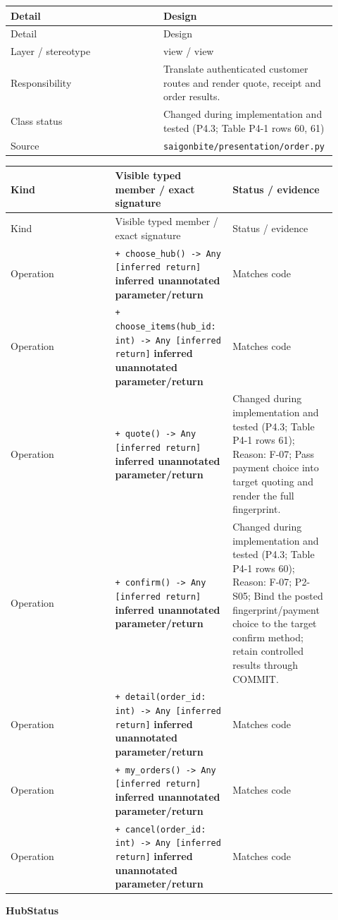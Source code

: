 \begin{longtable}{>{\raggedright\arraybackslash}p{0.4600\linewidth}>{\raggedright\arraybackslash}p{0.4600\linewidth}}
Detail & Design \\
\hline\endfirsthead
Detail & Design \\
\hline\endhead
Layer / stereotype & view / \guillemotleft{}view\guillemotright{} \\
Responsibility & Translate authenticated customer routes and render quote, receipt and order results. \\
Class status & Changed during implementation and tested (P4.3; Table P4-1 rows 60, 61) \\
Source & \texttt{saigonbite/\allowbreak{}presentation/\allowbreak{}order.\allowbreak{}py} \\
\end{longtable}
\begin{longtable}{>{\raggedright\arraybackslash}p{0.3067\linewidth}>{\raggedright\arraybackslash}p{0.3067\linewidth}>{\raggedright\arraybackslash}p{0.3067\linewidth}}
Kind & Visible typed member / exact signature & Status / evidence \\
\hline\endfirsthead
Kind & Visible typed member / exact signature & Status / evidence \\
\hline\endhead
Operation & \texttt{+ choose\_\allowbreak{}hub() -\textgreater{} Any [inferred return]} \textbf{inferred unannotated parameter/return} & Matches code \\
Operation & \texttt{+ choose\_\allowbreak{}items(hub\_\allowbreak{}id: int) -\textgreater{} Any [inferred return]} \textbf{inferred unannotated parameter/return} & Matches code \\
Operation & \texttt{+ quote() -\textgreater{} Any [inferred return]} \textbf{inferred unannotated parameter/return} & Changed during implementation and tested (P4.3; Table P4-1 rows 61); Reason: F-07; Pass payment choice into target quoting and render the full fingerprint. \\
Operation & \texttt{+ confirm() -\textgreater{} Any [inferred return]} \textbf{inferred unannotated parameter/return} & Changed during implementation and tested (P4.3; Table P4-1 rows 60); Reason: F-07; P2-S05; Bind the posted fingerprint/payment choice to the target confirm method; retain controlled results through COMMIT. \\
Operation & \texttt{+ detail(order\_\allowbreak{}id: int) -\textgreater{} Any [inferred return]} \textbf{inferred unannotated parameter/return} & Matches code \\
Operation & \texttt{+ my\_\allowbreak{}orders() -\textgreater{} Any [inferred return]} \textbf{inferred unannotated parameter/return} & Matches code \\
Operation & \texttt{+ cancel(order\_\allowbreak{}id: int) -\textgreater{} Any [inferred return]} \textbf{inferred unannotated parameter/return} & Matches code \\
\end{longtable}
\textbf{HubStatus}

